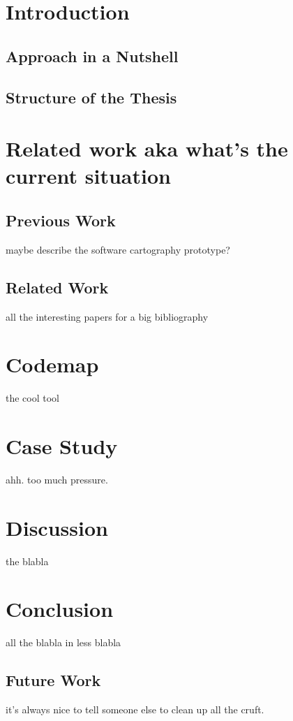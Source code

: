 \chapter{Introduction}
\section{Approach in a Nutshell}
\section{Structure of the Thesis}

\chapter{Related work aka what's the current situation}
\section{Previous Work}
maybe describe the software cartography prototype?
\section{Related Work}
all the interesting papers for a big bibliography

\chapter{Codemap}
the cool tool

\chapter{Case Study}
ahh. too much pressure.

\chapter{Discussion}
the blabla

\chapter{Conclusion}
all the blabla in less blabla
\section{Future Work}
it's always nice to tell someone else to clean up all the cruft.

